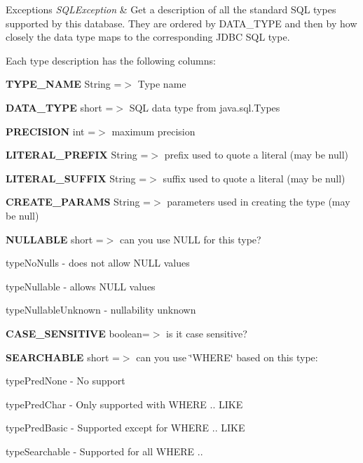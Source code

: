 \begin{DoxyExceptions}{Exceptions}
{\em S\+Q\+L\+Exception} & Get a description of all the standard S\+QL types supported by this database. They are ordered by D\+A\+T\+A\+\_\+\+T\+Y\+PE and then by how closely the data type maps to the corresponding J\+D\+BC S\+QL type. \\
\hline
\end{DoxyExceptions}
Each type description has the following columns\+: 
\begin{DoxyEnumerate}
\item {\bfseries T\+Y\+P\+E\+\_\+\+N\+A\+ME} String =$>$ Type name 
\item {\bfseries D\+A\+T\+A\+\_\+\+T\+Y\+PE} short =$>$ S\+QL data type from java.\+sql.\+Types 
\item {\bfseries P\+R\+E\+C\+I\+S\+I\+ON} int =$>$ maximum precision 
\item {\bfseries L\+I\+T\+E\+R\+A\+L\+\_\+\+P\+R\+E\+F\+IX} String =$>$ prefix used to quote a literal (may be null) 
\item {\bfseries L\+I\+T\+E\+R\+A\+L\+\_\+\+S\+U\+F\+F\+IX} String =$>$ suffix used to quote a literal (may be null) 
\item {\bfseries C\+R\+E\+A\+T\+E\+\_\+\+P\+A\+R\+A\+MS} String =$>$ parameters used in creating the type (may be null) 
\item {\bfseries N\+U\+L\+L\+A\+B\+LE} short =$>$ can you use N\+U\+LL for this type? 
\begin{DoxyItemize}
\item type\+No\+Nulls -\/ does not allow N\+U\+LL values 
\item type\+Nullable -\/ allows N\+U\+LL values 
\item type\+Nullable\+Unknown -\/ nullability unknown 
\end{DoxyItemize}
\item {\bfseries C\+A\+S\+E\+\_\+\+S\+E\+N\+S\+I\+T\+I\+VE} boolean=$>$ is it case sensitive? 
\item {\bfseries S\+E\+A\+R\+C\+H\+A\+B\+LE} short =$>$ can you use \char`\"{}\+W\+H\+E\+R\+E\char`\"{} based on this type\+: 
\begin{DoxyItemize}
\item type\+Pred\+None -\/ No support 
\item type\+Pred\+Char -\/ Only supported with W\+H\+E\+RE .. L\+I\+KE 
\item type\+Pred\+Basic -\/ Supported except for W\+H\+E\+RE .. L\+I\+KE 
\item type\+Searchable -\/ Supported for all W\+H\+E\+RE .. 

\end{DoxyItemize}
\end{DoxyEnumerate}
